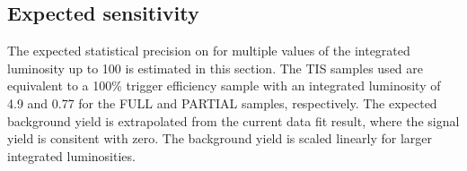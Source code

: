 \subsection{Expected sensitivity}
\label{subsec:sensitivity}

The expected statistical precision on \BRof\Kspizmm for multiple values of the integrated luminosity up to 100 \invfb is estimated in this section.
The TIS samples used are equivalent to a 100\% trigger efficiency sample with an integrated luminosity of 4.9 and 0.77 \invpb for the FULL  and PARTIAL samples, respectively. %
The expected background yield is extrapolated from the current data fit result, where the signal yield is consitent with zero.
The background yield is scaled linearly for larger integrated luminosities.

